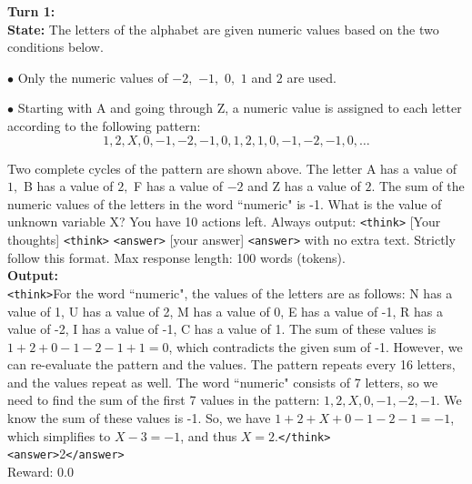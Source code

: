 \begin{tcolorbox}[breakable, colback=gray!2, colframe=black, boxrule=0.5pt, arc=2pt, width=\linewidth, title=Box 5: Model rollout after single-turn RL training]
\label{box:case2}
\textbf{Turn 1:} \\
\textbf{State:}
The letters of the alphabet are given numeric values based on the two conditions below.

$\bullet$  Only the numeric values of $-2,$ $-1,$ $0,$ $1$ and $2$ are used.

$\bullet$  Starting with A and going through Z, a numeric value is assigned to each letter according to the following pattern: $$
1, 2, X, 0, -1, -2, -1, 0, 1, 2, 1, 0, -1, -2, -1, 0,\ldots
$$

Two complete cycles of the pattern are shown above. The letter A has a value of $1,$ B has a value of $2,$ F has a value of $-2$ and Z has a value of $2$. The sum of the numeric values of the letters in the word ``numeric" is -1. What is the value of unknown variable X?
You have 10 actions left. Always output: \texttt{<think>} [Your thoughts] \texttt{<think>} \texttt{<answer>} [your answer] \texttt{<answer>} with no extra text. Strictly follow this format. Max response length: 100 words (tokens). \\
\textbf{Output:} \\
\texttt{<think>}For the word ``numeric", the values of the letters are as follows: N has a value of 1, U has a value of 2, M has a value of 0, E has a value of -1, R has a value of -2, I has a value of -1, C has a value of 1. The sum of these values is \(1 + 2 + 0 - 1 - 2 - 1 + 1 = 0\), which contradicts the given sum of -1. However, we can re-evaluate the pattern and the values. The pattern repeats every 16 letters, and the values repeat as well. The word ``numeric" consists of 7 letters, so we need to find the sum of the first 7 values in the pattern: \(1, 2, X, 0, -1, -2, -1\). We know the sum of these values is -1. So, we have \(1 + 2 + X + 0 - 1 - 2 - 1 = -1\), which simplifies to \(X - 3 = -1\), and thus \(X = 2\).\texttt{</think>} \\
\texttt{<answer>}2\texttt{</answer>} \\
Reward: 0.0


\end{tcolorbox}
